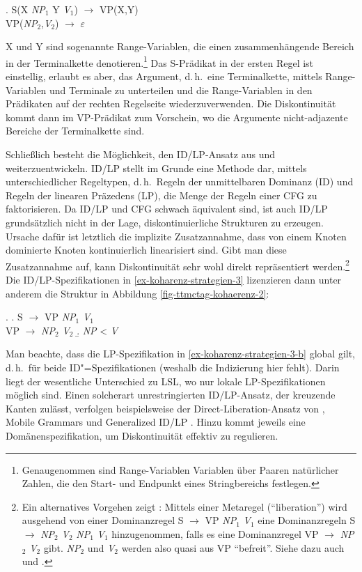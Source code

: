 \ex. \label{ex-koharenz-strategien-2}
S(X {\it NP$_1$} Y {\it V$_1$}) $\to$ VP(X,Y) \\
VP({\it NP$_2$},{\it V$_2$}) $\to$ $\varepsilon$
 
X und Y sind sogenannte Range-Variablen, die einen zusammenhängende Bereich in der Terminalkette denotieren.\footnote{Genaugenommen sind Range-Variablen Variablen über Paaren natürlicher Zahlen, die den Start- und Endpunkt eines Stringbereichs festlegen.} Das S-Prädikat in der ersten Regel ist einstellig, erlaubt es aber, das Argument, d.\,h.\ eine Terminalkette, mittels Range-Variablen und Terminale zu unterteilen und die Range-Variablen in den Prädikaten auf der rechten Regelseite wiederzuverwenden. Die Diskontinuität kommt dann im VP-Prädikat zum Vorschein, wo die Argumente nicht-adjazente Bereiche der Terminalkette sind.

Schlie\ss lich besteht die Möglichkeit, den ID/LP-Ansatz aus \cite{Gazdar:Pullum:81} und \cite{Shieber:84} weiterzuentwickeln. ID/LP stellt im Grunde eine Methode dar, mittels unterschiedlicher Regeltypen, d.\,h.\ Regeln der unmittelbaren Dominanz (ID) und Regeln der linearen Präzedens (LP), die Menge der Regeln einer CFG zu faktorisieren. Da ID/LP und CFG schwach äquivalent sind, ist auch ID/LP grundsätzlich nicht in der Lage, diskontinuierliche Strukturen zu erzeugen. Ursache dafür ist letztlich die implizite Zusatzannahme, dass von einem Knoten dominierte Knoten kontinuierlich linearisiert sind. Gibt man diese Zusatzannahme auf, kann Diskontinuität sehr wohl direkt repräsentiert werden.\footnote{Ein alternatives Vorgehen zeigt \cite{Pullum:82}: Mittels einer Metaregel ("`liberation"') wird ausgehend von einer Dominanzregel S $\to$ VP {\it NP$_1$} {\it V$_1$} eine Dominanzregeln S $\to$ {\it NP$_2$} {\it V$_2$} {\it NP$_1$} {\it V$_1$} hinzugenommen, falls es eine Dominanzregel VP $\to$ {\it NP$_2$} {\it V$_2$} gibt. {\it NP$_2$} und {\it V$_2$} werden also quasi aus VP "`befreit"'. Siehe dazu auch \citet[81f]{Kathol:95} und \citet[32f]{Kathol:00}.} Die ID/LP-Spezifikationen in \ref{ex-koharenz-strategien-3} lizenzieren dann unter anderem die Struktur in Abbildung \ref{fig-ttmctag-kohaerenz-2}: 

\ex. \label{ex-koharenz-strategien-3} 
\a. S $\to$ VP {\it NP$_1$} {\it V$_1$} \\
VP $\to$ {\it NP$_2$} {\it V$_2$}
\b. \label{ex-koharenz-strategien-3-b} {\it NP} < {\it V}

Man beachte, dass die LP-Spezifikation in \ref{ex-koharenz-strategien-3-b} global gilt, d.\,h.\ für beide ID"=Spezifikationen (weshalb die Indizierung hier fehlt). Darin liegt der wesentliche Unterschied zu LSL, wo nur lokale LP-Spezifikationen möglich sind. Einen solcherart unrestringierten ID/LP-Ansatz, der kreuzende Kanten zulässt, verfolgen  beispielsweise der Direct-Liberation-Ansatz von \cite{Zwicky:86}, Mobile Grammars \citep{Blevins:90} und Generalized ID/LP \citep{Daniels:05}. Hinzu kommt jeweils eine Domänenspezifikation, um Diskontinuität effektiv zu regulieren.

